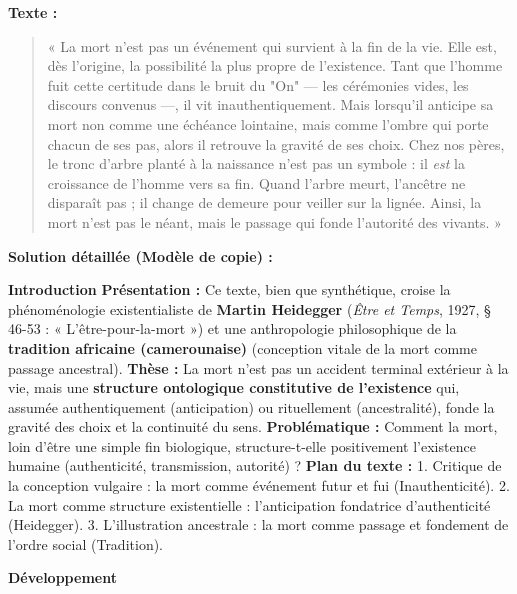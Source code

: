 \documentclass[11pt]{article}
\begin{document}
\begin{exoresolu}
\textbf{Texte :}
\begin{quote}
« La mort n'est pas un événement qui survient à la fin de la vie. Elle est, dès l'origine, la possibilité la plus propre de l'existence. Tant que l'homme fuit cette certitude dans le bruit du "On" — les cérémonies vides, les discours convenus —, il vit inauthentiquement. Mais lorsqu'il anticipe sa mort non comme une échéance lointaine, mais comme l'ombre qui porte chacun de ses pas, alors il retrouve la gravité de ses choix. Chez nos pères, le tronc d'arbre planté à la naissance n'est pas un symbole : il \emph{est} la croissance de l'homme vers sa fin. Quand l'arbre meurt, l'ancêtre ne disparaît pas ; il change de demeure pour veiller sur la lignée. Ainsi, la mort n'est pas le néant, mais le passage qui fonde l'autorité des vivants. »
\end{quote}

\tcblower

\textbf{Solution détaillée (Modèle de copie) :}

\textbf{Introduction}
\textbf{Présentation :} Ce texte, bien que synthétique, croise la phénoménologie existentialiste de \textbf{Martin Heidegger} (\emph{Être et Temps}, 1927, § 46-53 : « L'être-pour-la-mort ») et une anthropologie philosophique de la \textbf{tradition africaine (camerounaise)} (conception vitale de la mort comme passage ancestral).
\textbf{Thèse :} La mort n'est pas un accident terminal extérieur à la vie, mais une \textbf{structure ontologique constitutive de l'existence} qui, assumée authentiquement (anticipation) ou rituellement (ancestralité), fonde la gravité des choix et la continuité du sens.
\textbf{Problématique :} Comment la mort, loin d'être une simple fin biologique, structure-t-elle positivement l'existence humaine (authenticité, transmission, autorité) ?
\textbf{Plan du texte :} 1. Critique de la conception vulgaire : la mort comme événement futur et fui (Inauthenticité). 2. La mort comme structure existentielle : l'anticipation fondatrice d'authenticité (Heidegger). 3. L'illustration ancestrale : la mort comme passage et fondement de l'ordre social (Tradition).

\textbf{Développement}


\end{exoresolu}
\end{document}
